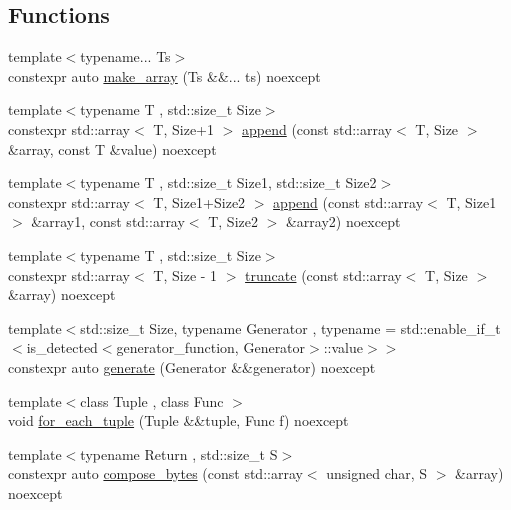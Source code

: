 \subsection*{Functions}
\begin{DoxyCompactItemize}
\item 
{\footnotesize template$<$typename... Ts$>$ }\\constexpr auto \mbox{\hyperlink{namespacedistant_1_1utility_1_1meta_a82ae6ce7d1f5abeee347027c95ff986e}{make\+\_\+array}} (Ts \&\&... ts) noexcept
\item 
{\footnotesize template$<$typename T , std\+::size\+\_\+t Size$>$ }\\constexpr std\+::array$<$ T, Size+1 $>$ \mbox{\hyperlink{namespacedistant_1_1utility_1_1meta_a03f70faa19018e00727dfb7c53319bff}{append}} (const std\+::array$<$ T, Size $>$ \&array, const T \&value) noexcept
\item 
{\footnotesize template$<$typename T , std\+::size\+\_\+t Size1, std\+::size\+\_\+t Size2$>$ }\\constexpr std\+::array$<$ T, Size1+Size2 $>$ \mbox{\hyperlink{namespacedistant_1_1utility_1_1meta_af906f08f34a3f7c55985df5556b1ce90}{append}} (const std\+::array$<$ T, Size1 $>$ \&array1, const std\+::array$<$ T, Size2 $>$ \&array2) noexcept
\item 
{\footnotesize template$<$typename T , std\+::size\+\_\+t Size$>$ }\\constexpr std\+::array$<$ T, Size -\/ 1 $>$ \mbox{\hyperlink{namespacedistant_1_1utility_1_1meta_ab001afce8c8e9e18d68a47eab7b95768}{truncate}} (const std\+::array$<$ T, Size $>$ \&array) noexcept
\item 
{\footnotesize template$<$std\+::size\+\_\+t Size, typename Generator , typename  = std\+::enable\+\_\+if\+\_\+t$<$is\+\_\+detected$<$generator\+\_\+function, Generator$>$\+::value$>$$>$ }\\constexpr auto \mbox{\hyperlink{namespacedistant_1_1utility_1_1meta_a2f4bc82868002f3838262b733bf762a0}{generate}} (Generator \&\&generator) noexcept
\item 
{\footnotesize template$<$class Tuple , class Func $>$ }\\void \mbox{\hyperlink{namespacedistant_1_1utility_1_1meta_a5984385b95013d564582d4fc91051ffe}{for\+\_\+each\+\_\+tuple}} (Tuple \&\&tuple, Func f) noexcept
\item 
{\footnotesize template$<$typename Return , std\+::size\+\_\+t S$>$ }\\constexpr auto \mbox{\hyperlink{namespacedistant_1_1utility_1_1meta_ac986b206bd7b64c88fd00a12ad54b350}{compose\+\_\+bytes}} (const std\+::array$<$ unsigned char, S $>$ \&array) noexcept

\end{DoxyCompactItemize}
